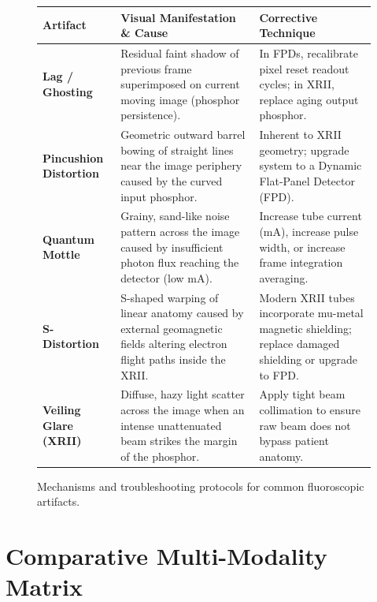 \documentclass[11pt,a4paper]{article}
\begin{document}
\begin{figure}[htbp]
\centering
\setlength{\tabcolsep}{4pt}
\begin{tabular}{p{3.2cm}p{5.5cm}p{5.5cm}}
\toprule
\textbf{Artifact} & \textbf{Visual Manifestation \& Cause} & \textbf{Corrective Technique} \\
\midrule
\textbf{Lag / Ghosting} & Residual faint shadow of previous frame superimposed on current moving image (phosphor persistence). & In FPDs, recalibrate pixel reset readout cycles; in XRII, replace aging output phosphor. \\
\addlinespace
\textbf{Pincushion Distortion} & Geometric outward barrel bowing of straight lines near the image periphery caused by the curved input phosphor. & Inherent to XRII geometry; upgrade system to a Dynamic Flat-Panel Detector (FPD). \\
\addlinespace
\textbf{Quantum Mottle} & Grainy, sand-like noise pattern across the image caused by insufficient photon flux reaching the detector (low mA). & Increase tube current (mA), increase pulse width, or increase frame integration averaging. \\
\addlinespace
\textbf{S-Distortion} & S-shaped warping of linear anatomy caused by external geomagnetic fields altering electron flight paths inside the XRII. & Modern XRII tubes incorporate mu-metal magnetic shielding; replace damaged shielding or upgrade to FPD. \\
\addlinespace
\textbf{Veiling Glare (XRII)} & Diffuse, hazy light scatter across the image when an intense unattenuated beam strikes the margin of the phosphor. & Apply tight beam collimation to ensure raw beam does not bypass patient anatomy. \\
\bottomrule
\end{tabular}
\caption{Mechanisms and troubleshooting protocols for common fluoroscopic artifacts.}
\label{tab:fluoroscopy_artifacts}
\end{figure}

\section{Comparative Multi-Modality Matrix}
\end{document}
